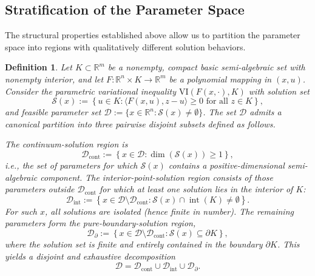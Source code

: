 \documentclass[sn-basic,Numbered]{sn-jnl}
\theoremstyle{thmstyleone}%
\newtheorem{definition}{Definition}%
\begin{document}
\subsection{Stratification of the Parameter Space}
The structural properties established above allow us to partition the parameter space into regions with qualitatively different solution behaviors.

\begin{definition}\label{def:parameter_partition}
Let $K \subset \mathbb{R}^m$ be a nonempty, compact basic semi-algebraic set with nonempty interior, and let $F : \mathbb{R}^n \times K \to \mathbb{R}^m$ be a polynomial mapping in $(x, u)$. Consider the parametric variational inequality $\mathrm{VI}(F(x,\cdot), K)$ with solution set
\[
\mathcal{S}(x) := \left\{ u \in K : \langle F(x, u), z - u \rangle \ge 0 \text{ for all } z \in K \right\},
\]
and feasible parameter set $\mathcal{D} := \{ x \in \mathbb{R}^n : \mathcal{S}(x) \neq \emptyset \}$. The set $\mathcal{D}$ admits a canonical partition into three pairwise disjoint subsets defined as follows.

The \emph{continuum-solution region} is
\[
\mathcal{D}_{\mathrm{cont}} := \left\{ x \in \mathcal{D} : \dim(\mathcal{S}(x)) \ge 1 \right\},
\]
i.e., the set of parameters for which $\mathcal{S}(x)$ contains a positive-dimensional semi-algebraic component. The \emph{interior-point-solution region} consists of those parameters outside $\mathcal{D}_{\mathrm{cont}}$ for which at least one solution lies in the interior of $K$:
\[
\mathcal{D}_{\mathrm{int}} := \left\{ x \in \mathcal{D} \setminus \mathcal{D}_{\mathrm{cont}} : \mathcal{S}(x) \cap \operatorname{int}(K) \neq \emptyset \right\}.
\]
For such $x$, all solutions are isolated (hence finite in number). The remaining parameters form the \emph{pure-boundary-solution region},
\[
\mathcal{D}_{\partial} := \left\{ x \in \mathcal{D} \setminus \mathcal{D}_{\mathrm{cont}} : \mathcal{S}(x) \subseteq \partial K \right\},
\]
where the solution set is finite and entirely contained in the boundary $\partial K$. This yields a disjoint and exhaustive decomposition
\[
\mathcal{D} = \mathcal{D}_{\mathrm{cont}} \cup \mathcal{D}_{\mathrm{int}} \cup \mathcal{D}_{\partial}.
\]
\end{definition}
\end{document}
